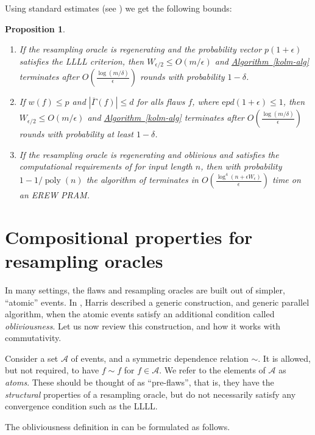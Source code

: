 \documentclass[11pt]{article}
\newcommand{\expref}[2]{\texorpdfstring{\hyperref[#2]{#1~\ref{#2}}}{#1~\ref{#2}}}
\newtheorem{proposition}[theorem]{Proposition}
\newcommand{\eee}{\mathrm e}
\DeclareMathOperator{\poly}{poly}
\begin{document}
 Using standard estimates (see \cite{ParallelHarrisHaeupler, Kolmofocs, AIS}) we get the following bounds:
\begin{proposition}
\begin{enumerate} 
\item If the resampling oracle is regenerating and the probability vector $p (1+\epsilon)$ satisfies the LLLL criterion, then $W_{\epsilon/2} \leq O(m/\epsilon)$ and \expref{Algorithm}{kolm-alg} terminates after $O( \frac{ \log (m/\delta)}{\epsilon})$ rounds with probability $1 - \delta$.
\item If $w(f) \leq p$ and $|\overline \Gamma(f)| \leq d$ for alls flaws $f$, where
$\eee p d (1+\epsilon) \leq 1$, then $W_{\epsilon/2} \leq O(m/\epsilon)$ and \expref{Algorithm}{kolm-alg} terminates after $O( \frac{ \log (m/\delta)}{\epsilon})$ rounds with probability at least $1 - \delta$.
\item If the resampling oracle is regenerating and oblivious and satisfies the computational requirements of \cite{ParallelHarris} for input length $n$, then with probability $1 - 1/\poly(n)$ the algorithm of \cite{ParallelHarris} terminates in $O( \frac{ \log^4(n + \epsilon W_\epsilon) }{\epsilon})$ time on an EREW PRAM.
 \end{enumerate}  
\end{proposition}



\section{Compositional properties for resampling oracles} 
\label{comp-sec}
In many settings, the flaws and resampling oracles are built out of simpler, ``atomic'' events. In \cite{ParallelHarris}, Harris described a generic construction, and generic parallel algorithm, when the atomic events satisfy an additional
%
condition  %
called \emph{obliviousness}. Let us now review this construction, and how it works with commutativity. 

Consider a set $\mathcal A$ of events, and a symmetric dependence relation $\sim$. It is allowed, but not required, to have $f \sim f$ for $f \in \mathcal A$. We refer to the elements of $\mathcal A$ as \emph{atoms}. These should be thought of as ``pre-flaws'', that is, they have the \emph{structural}  properties of a resampling oracle, but do not necessarily satisfy any convergence condition such as the LLLL.  

The obliviousness definition in \cite{ParallelHarris} can be formulated 
as follows. %
\end{document}
